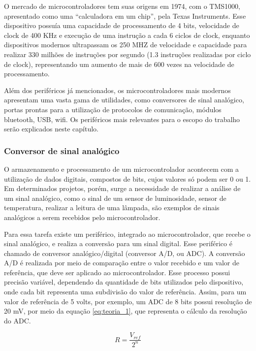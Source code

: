 O mercado de microcontroladores tem suas origens em 1974, com o TMS1000, apresentado como uma “calculadora em um chip”, pela Texas Instruments. Esse dispositivo possuía uma capacidade de processamento de 4 bits, velocidade de clock de 400 KHz e execução de uma instrução a cada 6 ciclos de clock, enquanto dispositivos modernos ultrapassam os 250 MHZ de velocidade e capacidade para realizar 330 milhões de instruções por segundo (1.3 instruções realizadas por ciclo de clock), representando um aumento de mais de 600 vezes na velocidade de processamento.

Além dos periféricos já mencionados, os microcontroladores mais modernos apresentam uma vasta gama de utilidades, como conversores de sinal analógico, portas prontas para a utilização de protocolos de comunicação, módulos bluetooth, USB, wifi. Os periféricos mais relevantes para o escopo do trabalho serão explicados neste capítulo.

\subsubsection{Conversor de sinal analógico}

O armazenamento e processamento de um microcontrolador acontecem com a utilização de dados digitais, compostos de bits, cujos valores só podem ser 0 ou 1. Em determinados projetos, porém, surge a necessidade de realizar a análise de um sinal analógico, como o sinal de um sensor de luminosidade, sensor de temperatura, realizar a leitura de uma lâmpada, são exemplos de sinais analógicos a serem recebidos pelo microcontrolador.

Para essa tarefa existe um periférico, integrado ao microcontrolador, que recebe o sinal analógico, e realiza a conversão para um sinal digital. Esse periférico é chamado de conversor analógico/digital (conversor A/D, ou ADC). A conversão A/D é realizada por meio de comparação entre o valor recebido e um valor de referência, que deve ser aplicado ao microcontrolador. Esse processo possui precisão variável, dependendo da quantidade de bits utilizados pelo dispositivo, onde cada bit representa uma subdivisão do valor de referência. Assim, para um valor de referência de 5 volts, por exemplo, um ADC de 8 bits possui resolução de 20 mV, por meio da equação \ref{eq:teoria_1}, que representa o cálculo da resolução do ADC.

\begin{equation}
\label{eq:teoria_1}
R = \frac{V_{ref}}{2^n}
\end{equation}


